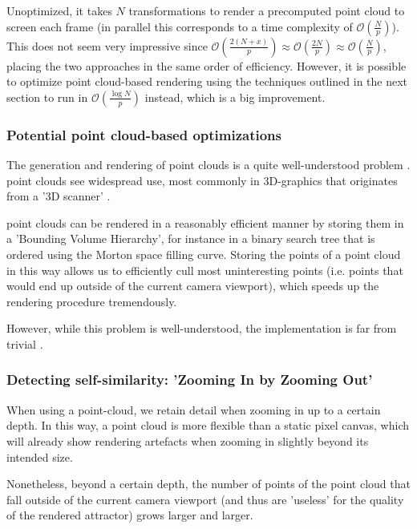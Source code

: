 \documentclass[11pt]{article}
\begin{document}
Unoptimized, it takes \(N\) transformations to render a precomputed point cloud to screen each frame (in parallel this corresponds to a time complexity of \(\mathcal{O}(\frac{N}{p})\)).
This does not seem very impressive since \(\mathcal{O}(\frac{2(N+x)}{p}) \approx \mathcal{O}(\frac{2N}{p}) \approx \mathcal{O}(\frac{N}{p})\),
placing the two approaches in the same order of efficiency. However, it is possible to optimize point cloud-based rendering using the techniques outlined in the next section
to run in \(\mathcal{O}(\frac{\log{N}}{p})\) instead, which is a big improvement.

\subsubsection{Potential point cloud-based optimizations}
\label{sec:org05e8372}
\label{subsection:point_cloud_optimizations}

The generation and rendering of point clouds is a quite well-understood problem \cite{wimmer2006instant}. point clouds see widespread use,
most commonly in 3D-graphics that originates from a '3D scanner' .

point clouds can be rendered in a reasonably efficient manner by storing them in a 'Bounding Volume Hierarchy',
for instance in a binary search tree that is ordered using the Morton space filling curve. \cite{lauterbach2009construction}
Storing the points of a point cloud in this way allows us to efficiently cull most uninteresting points (i.e. points that would end up outside of the current camera viewport),
which speeds up the rendering procedure tremendously.

However, while this problem is well-understood, the implementation is far from trivial \cite{lauterbach2009construction}.

\subsubsection{Detecting self-similarity: 'Zooming In by Zooming Out'}
\label{sec:org57c8b7f}
\label{subsection:self_similarity}

When using a point-cloud, we retain detail when zooming in up to a certain depth. In this way, a point cloud is more flexible than a 
static pixel canvas, which will already show rendering artefacts when zooming in slightly beyond its intended size.

Nonetheless, beyond a certain depth, the number of points of the point cloud that fall outside of the current camera viewport
(and thus are 'useless' for the quality of the rendered attractor) grows larger and larger.
\end{document}
